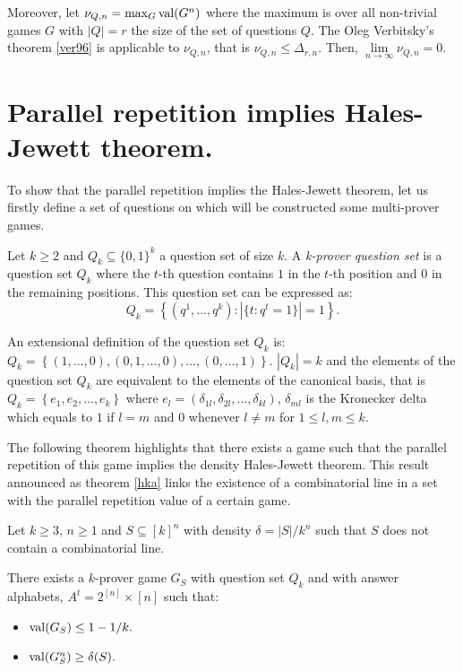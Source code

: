 Moreover, let $\nu_{Q,n}=\max_G \mathrm{val} (G^n)$ where the maximum is over all non-trivial games $G$ with $|Q|=r$ the size of the set of questions $Q.$ 
The Oleg Verbitsky's theorem \eqref{ver96} is applicable to $\nu_{Q,n}$, that is $\nu_{Q,n} \leq \Delta_{r,n}.$
Then, $\lim\limits_{n\longrightarrow \infty} \nu_{Q,n}=0.$

\section{Parallel repetition implies Hales-Jewett theorem.}
 
To show that the parallel repetition implies the Hales-Jewett theorem, let us firstly define a set of questions on which will be constructed some multi-prover games.

\begin{defn}Let $k\geq 2$ and $Q_k \subseteq \{0,1\}^k$ a question set of size $k.$ A \textit{k-prover question set} is a question set $Q_k$ where the $t$-th question contains $1$ in the $t$-th position and $0$ in the remaining positions. This question set can be expressed as:
$$Q_k=\left\lbrace(q^1, \ldots, q^k): |\{t:q^t=1\}|=1\right\rbrace.$$		\end{defn}
 
 An extensional definition of the question set $Q_k$ is: $Q_k=\left\lbrace (1,\ldots,0), (0,1,\ldots,0), \ldots, (0,\ldots,1) \right\rbrace.$ $|Q_k|=k$ and the elements of the question set $Q_k$ are equivalent to the elements of the canonical basis, that is $Q_k= \left\lbrace e_1, e_2, \ldots, e_k\right\rbrace$ where $e_l=(\delta_{1l}, \delta_{2l}, \ldots, \delta_{kl} )$, $\delta_{ml}$ is the Kronecker delta which equals to $1$ if $l=m$ and $0$ whenever $l \neq m$ for $1 \leq l, m \leq  k.$ 

The following theorem highlights that there exists a game such that the parallel repetition of this game  implies the density Hales-Jewett theorem. This result announced as theorem \eqref{hka} links the existence of a combinatorial line in a set with the parallel repetition value of a certain game.

 \begin{thm} Let $k\geq 3$, $n\geq 1$ and $S\subseteq [k]^n$ with density $\delta=|S|/k^n$ such that $S$ does not contain a combinatorial line.	
 
There exists a $k$-prover game $G_S$ with question set $Q_k$ and with answer alphabets,
$A^t = 2^{[n]} \times [n]$ such that:
\begin{itemize}
\item $\mathrm{val} (G_S) \leq 1-1/k.$ 	\item $\mathrm{val} (G_S^n) \geq \delta(S).$
\end{itemize} \label{hka}
 	\end{thm}

